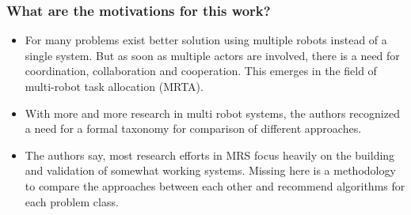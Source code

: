 \subsubsection*{What are the motivations for this work?}
\begin{itemize}
    \item For many problems exist better solution using multiple robots instead of a single system. But as soon as multiple actors are involved, there is a need for coordination, collaboration and cooperation. This emerges in the field of multi-robot task allocation (MRTA).
    \item With more and more research in multi robot systems, the authors recognized a need for a formal taxonomy for comparison of different approaches. 
    \item The authors say, most research efforts in MRS focus heavily on the building and validation of somewhat working systems. Missing here is a methodology to compare the approaches between each other and recommend algorithms for each problem class.
\end{itemize}
